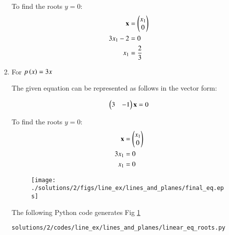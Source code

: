 \begin{enumerate}
To find the roots $y=0$:
\begin{align}
\mathbf{x} &= \begin{pmatrix}x_1\\0\end{pmatrix} \\
3x_1 - 2 &= 0 \\
x_1 &= \frac{2}{3}
\end{align}
\item 
 For $p\left(x\right) = 3x$
\begin{flushleft}
The given equation can be represented as follows in the vector form:
\end{flushleft}
\begin{align}
\begin{pmatrix}
3 & -1 
\end{pmatrix}
\mathbf{x}  = 0
\end{align}

To find the roots $y=0$:
\begin{align}
\mathbf{x} &= \begin{pmatrix}x_1\\0\end{pmatrix} \\
3x_1  &= 0 \\
x_1 &= 0
\end{align}
\begin{figure}[!ht] 
\centering
\texttt{[image: ./solutions/2/figs/line\_ex/lines\_and\_planes/final\_eq.eps]}
\caption{}
\label{fig:3.7.2_eq_lines_and_planes}
\end{figure}
 
The  following Python code generates Fig \ref{fig:3.7.2_eq_lines_and_planes}
\begin{lstlisting}
solutions/2/codes/line_ex/lines_and_planes/linear_eq_roots.py
\end{lstlisting}

\end{enumerate}
